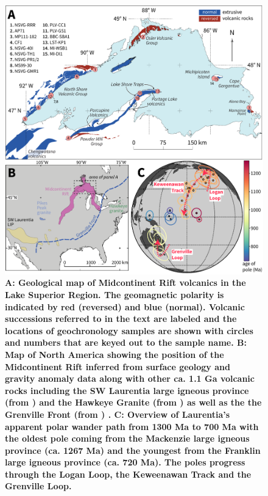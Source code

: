 \documentclass[11pt,letterpaper]{article}
\begin{document}
\begin{figure}
\centering
\includegraphics[width=6.5 in]{Figures/Fig1_MCR_map.pdf}
\caption{\small{\textbf{A: Geological map of Midcontinent Rift volcanics in the Lake Superior Region. The geomagnetic polarity is indicated by red (reversed) and blue (normal). Volcanic successions referred to in the text are labeled and the locations of geochronology samples are shown with circles and numbers that are keyed out to the sample name. B: Map of North America showing the position of the Midcontinent Rift inferred from surface geology and gravity anomaly data along with other ca. 1.1 Ga volcanic rocks including the SW Laurentia large igneous province (from \citealp{Bright2014a}) and the Hawkeye Granite (from \citealp{McLelland_ref}) as well as the the Grenville Front (from \citealp{Rivers2015a}) . C: Overview of Laurentia's apparent polar wander path from 1300 Ma to 700 Ma with the oldest pole coming from the Mackenzie large igneous province (ca. 1267 Ma) and the youngest from the Franklin large igneous province (ca. 720 Ma). The poles progress through the Logan Loop, the Keweenawan Track and the Grenville Loop.}}}
\label{fig:MCR_Map}
\end{figure}
\end{document}
